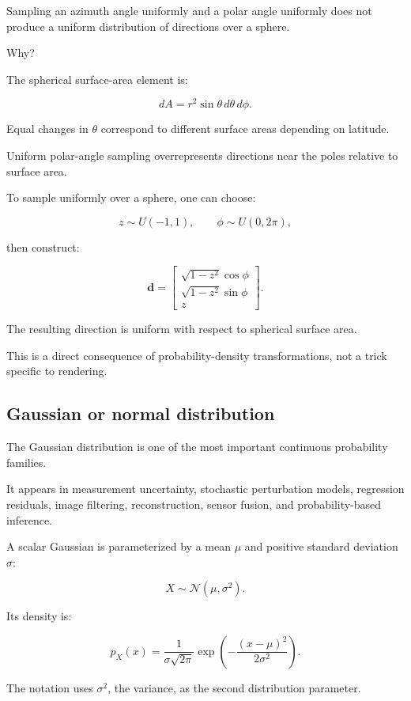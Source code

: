 Sampling an azimuth angle uniformly and a polar angle uniformly does not produce a uniform distribution of directions over a sphere.

Why?

The spherical surface-area element is:

\[
 dA=r^2\sin\theta\,d\theta\,d\phi.
\]

Equal changes in \(\theta\) correspond to different surface areas depending on latitude.

Uniform polar-angle sampling overrepresents directions near the poles relative to surface area.

To sample uniformly over a sphere, one can choose:

\[
 z\sim U(-1,1), \qquad \phi\sim U(0,2\pi),
\]

then construct:

\[
 \mathbf d= \begin{bmatrix} \sqrt{1-z^2}\cos\phi\\ \sqrt{1-z^2}\sin\phi\\ z \end{bmatrix}.
\]

The resulting direction is uniform with respect to spherical surface area.

This is a direct consequence of probability-density transformations, not a trick specific to rendering.

\subsection{Gaussian or normal distribution}\label{02-foundations-ii-ch023-gaussian-or-normal-distribution}

The Gaussian distribution is one of the most important continuous probability families.

It appears in measurement uncertainty, stochastic perturbation models, regression residuals, image filtering, reconstruction, sensor fusion, and probability-based inference.

A scalar Gaussian is parameterized by a mean \(\mu\) and positive standard deviation \(\sigma\):

\[
 \boxed{ X\sim\mathcal N(\mu,\sigma^2) }.
\]

Its density is:

\[
 \boxed{ p_X(x)= \frac1{\sigma\sqrt{2\pi}} \exp\left( -\frac{(x-\mu)^2}{2\sigma^2} \right) }.
\]

The notation uses \(\sigma^2\), the variance, as the second distribution parameter.

